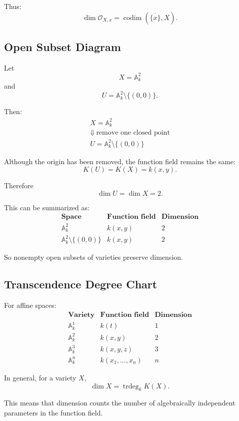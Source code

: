 \documentclass[12pt,a4paper]{article}
\theoremstyle{notespace}
\begin{document}
Thus:
\[
\boxed{
	\dim \mathcal O_{X,x}
	=
	\operatorname{codim}(\overline{\{x\}},X).
}
\]

\subsection{Open Subset Diagram}

Let
\[
X=\mathbb A^2_k
\]
and
\[
U=\mathbb A^2_k\setminus \{(0,0)\}.
\]

Then:
\[
\begin{array}{c}
	X=\mathbb A^2_k
	\\[0.7em]
	\Downarrow\ \text{remove one closed point}
	\\[0.7em]
	U=\mathbb A^2_k\setminus\{(0,0)\}
\end{array}
\]

Although the origin has been removed, the function field remains the same:
\[
K(U)=K(X)=k(x,y).
\]

Therefore
\[
\dim U=\dim X=2.
\]

This can be summarized as:
\[
\begin{array}{c|c|c}
	\textbf{Space}
	&
	\textbf{Function field}
	&
	\textbf{Dimension}
	\\
	\hline
	\mathbb A^2_k
	&
	k(x,y)
	&
	2
	\\
	\mathbb A^2_k\setminus\{(0,0)\}
	&
	k(x,y)
	&
	2
\end{array}
\]

So nonempty open subsets of varieties preserve dimension.

\subsection{Transcendence Degree Chart}

For affine spaces:
\[
\begin{array}{c|c|c}
	\textbf{Variety}
	&
	\textbf{Function field}
	&
	\textbf{Dimension}
	\\
	\hline
	\mathbb A^1_k
	&
	k(t)
	&
	1
	\\
	\mathbb A^2_k
	&
	k(x,y)
	&
	2
	\\
	\mathbb A^3_k
	&
	k(x,y,z)
	&
	3
	\\
	\mathbb A^n_k
	&
	k(x_1,\dots,x_n)
	&
	n
\end{array}
\]

In general, for a variety \(X\),
\[
\boxed{
	\dim X=\operatorname{trdeg}_k K(X).
}
\]

This means that dimension counts the number of algebraically independent parameters in the function field.
\end{document}

